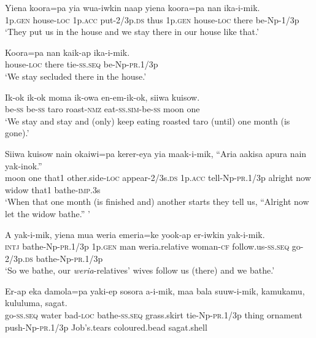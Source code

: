 \ea\label{ex:a:x5}
\gll  Yiena  koora=pa  yia  wua-iwkin  naap  yiena  koora=pa      nan  ika-i-mik. \\
1p.\textsc{gen}  house-\textsc{loc}  1p.\textsc{acc}  put-2/3p.\textsc{ds}  thus  1p.\textsc{gen}  house-\textsc{loc}   there  be-Np-1/3p \\


\glt ‘They put us in the house and we stay there in our house like that.’ \\
\z


\ea\label{ex:a:x6}
\gll  Koora=pa  nan  kaik-ap  ika-i-mik. \\
house-\textsc{loc}  there  tie-\textsc{ss.seq}  be-Np-\textsc{pr}.1/3p \\
\glt ‘We stay secluded there in the house.’ \\
\z


\ea\label{ex:a:x7}
\gll  Ik-ok  ik-ok  moma  ik-owa  en-em-ik-ok,  siiwa  kuisow. \\
be-\textsc{ss}  be-\textsc{ss}  taro  roast-\textsc{nmz}  eat-\textsc{ss}.\textsc{sim}-be-\textsc{ss}  moon  one \\
\glt ‘We stay and stay and (only) keep eating roasted taro (until) one month (is gone).’ \\
\z


\ea\label{ex:a:x8}
\gll  Siiwa  kuisow  nain  okaiwi=pa  kerer-eya  yia  maak-i-mik,           “Aria  aakisa  apura  nain  yak-inok.” \\
moon  one  that1  other.side-\textsc{loc}  appear-2/3s.\textsc{ds}  1p.\textsc{acc}  tell-Np-\textsc{pr}.1/3p   alright  now  widow  that1  bathe-\textsc{imp}.3s \\


\glt ‘When that one month (is finished and) another starts they tell us, “Alright now let the widow bathe.” ’ \\
\z


\ea\label{ex:a:x9}
\gll  A  yak-i-mik,  yiena  mua  weria  emeria=ke             yook-ap  er-iwkin  yak-i-mik. \\
\textsc{intj}  bathe-Np-\textsc{pr}.1/3p  1p.\textsc{gen}  man  weria.relative  woman-\textsc{cf} follow.us-\textsc{ss.seq}  go-2/3p.\textsc{ds}  bathe-Np-\textsc{pr}.1/3p \\


\glt ‘So we bathe, our \textit{weria}{}-relatives’ wives follow us (there) and we bathe.’ \\
\z


\ea\label{ex:a:x10}
\gll  Er-ap  eka  damola=pa  yaki-ep  sosora  a-i-mik,                maa  bala  suuw-i-mik,  kamukamu,  kululuma,  sagat. \\
go-\textsc{ss.seq}  water  bad-\textsc{loc}  bathe-\textsc{ss.seq}  grass.skirt  tie-Np-\textsc{pr}.1/3p  thing  ornament  push-Np-\textsc{pr}.1/3p  Job’s.tears  coloured.bead  sagat.shell \\


